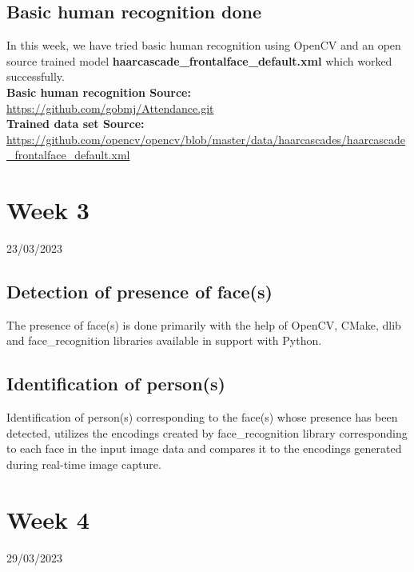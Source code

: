 \documentclass[12pt]{book}
\begin{document}
	\section{Basic human recognition done}
	In this week, we have tried basic human recognition using OpenCV and an open source trained model \textbf{haarcascade\_frontalface\_default.xml} which worked successfully. \\[12pt]
	\normalsize
	\textbf{Basic human recognition Source:} \\
	\url{https://github.com/gobmj/Attendance.git}
	\\[6pt]
	\textbf{Trained data set Source:} \\ \url{https://github.com/opencv/opencv/blob/master/data/haarcascades/haarcascade\_frontalface\_default.xml}
   
    
    \chapter{Week 3}
    \justifying
    \large
    23/03/2023
    
    \paragraph{}
    \section{Detection of presence of face(s)}
        The presence of face(s) is done primarily with the help of OpenCV, CMake, dlib and face\_recognition libraries available in support with Python.  
    \section{Identification of person(s)}
    Identification of person(s) corresponding to the face(s) whose presence has been detected, utilizes the encodings created by face\_recognition library corresponding to each face in the input image data and compares it to the encodings generated during real-time image capture.
    

	\chapter{Week 4}
	\justifying
	\large
	29/03/2023
	
	\paragraph{}
\end{document}
